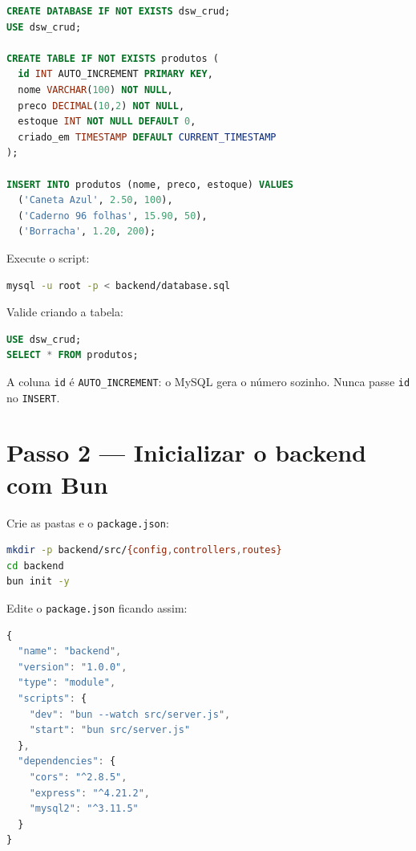 \documentclass[11pt,a4paper]{article}
\begin{document}
\begin{lstlisting}[language=SQL, caption={\texttt{backend/database.sql}}]
CREATE DATABASE IF NOT EXISTS dsw_crud;
USE dsw_crud;

CREATE TABLE IF NOT EXISTS produtos (
  id INT AUTO_INCREMENT PRIMARY KEY,
  nome VARCHAR(100) NOT NULL,
  preco DECIMAL(10,2) NOT NULL,
  estoque INT NOT NULL DEFAULT 0,
  criado_em TIMESTAMP DEFAULT CURRENT_TIMESTAMP
);

INSERT INTO produtos (nome, preco, estoque) VALUES
  ('Caneta Azul', 2.50, 100),
  ('Caderno 96 folhas', 15.90, 50),
  ('Borracha', 1.20, 200);
\end{lstlisting}

Execute o script:

\begin{lstlisting}[language=bash]
mysql -u root -p < backend/database.sql
\end{lstlisting}

Valide criando a tabela:

\begin{lstlisting}[language=SQL]
USE dsw_crud;
SELECT * FROM produtos;
\end{lstlisting}

\begin{caixa-dica}
A coluna \texttt{id} é \texttt{AUTO\_INCREMENT}: o MySQL gera o número sozinho. Nunca passe \texttt{id} no \texttt{INSERT}.
\end{caixa-dica}

\section{Passo 2 --- Inicializar o backend com Bun}

Crie as pastas e o \texttt{package.json}:

\begin{lstlisting}[language=bash]
mkdir -p backend/src/{config,controllers,routes}
cd backend
bun init -y
\end{lstlisting}

Edite o \texttt{package.json} ficando assim:

\begin{lstlisting}[language=JavaScript, caption={\texttt{backend/package.json}}]
{
  "name": "backend",
  "version": "1.0.0",
  "type": "module",
  "scripts": {
    "dev": "bun --watch src/server.js",
    "start": "bun src/server.js"
  },
  "dependencies": {
    "cors": "^2.8.5",
    "express": "^4.21.2",
    "mysql2": "^3.11.5"
  }
}
\end{lstlisting}
\end{document}
